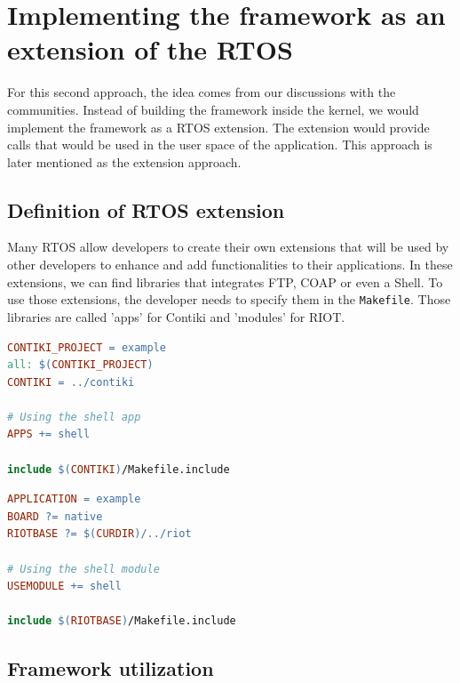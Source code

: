 \section{Implementing the framework as an extension of the RTOS \label{sec:extension}}

For this second approach, the idea comes from our discussions with the communities.
Instead of building the framework inside the kernel, we would implement the framework as a RTOS extension.
The extension would provide calls that would be used in the user space of the application.
This approach is later mentioned as the extension approach.

\subsection{Definition of RTOS extension}

Many RTOS allow developers to create their own extensions that will be used by other developers to enhance and add functionalities to their applications.
In these extensions, we can find libraries that integrates FTP, COAP or even a Shell.
To use those extensions, the developer needs to specify them in the \texttt{Makefile}.
Those libraries are called 'apps' for Contiki and 'modules' for RIOT.

\begin{minipage}{.45\textwidth}
\begin{lstlisting}[style=CStyle, language=make, caption=example of Makefile using the app \texttt{shell} with Contiki]
CONTIKI_PROJECT = example
all: $(CONTIKI_PROJECT)
CONTIKI = ../contiki

# Using the shell app
APPS += shell 

include $(CONTIKI)/Makefile.include
\end{lstlisting}
\end{minipage}\hfill
\begin{minipage}{.45\textwidth}
\begin{lstlisting}[style=CStyle, language=make, caption=example of Makefile using the module \texttt{shell} with RIOT]
APPLICATION = example
BOARD ?= native
RIOTBASE ?= $(CURDIR)/../riot

# Using the shell module
USEMODULE += shell 

include $(RIOTBASE)/Makefile.include
\end{lstlisting}
\end{minipage}

\subsection{Framework utilization}

